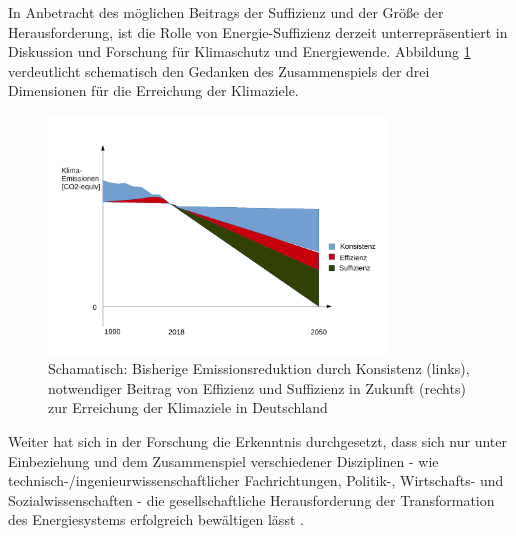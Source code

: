\documentclass[a4paper,11pt,twoside]{scrartcl}
\begin{document}
In Anbetracht des möglichen Beitrags der Suffizienz und der Größe der Herausforderung, ist die Rolle von Energie-Suffizienz derzeit unterrepräsentiert in Diskussion und Forschung für Klimaschutz und Energiewende. Abbildung \ref{fig:zusammenspiel} verdeutlicht schematisch den Gedanken des Zusammenspiels der drei Dimensionen für die Erreichung der Klimaziele. 


\begin{figure}[!h]
    \centering
    \includegraphics[width=0.8\textwidth]{figures/Zusammenspiel2.pdf}
    \caption{Schamatisch: Bisherige Emissionsreduktion durch Konsistenz (links), notwendiger Beitrag von Effizienz und Suffizienz in Zukunft (rechts) zur Erreichung der Klimaziele in Deutschland}
    \label{fig:zusammenspiel}
\end{figure}

Weiter hat sich in der Forschung die Erkenntnis durchgesetzt, dass sich nur unter Einbeziehung und dem Zusammenspiel verschiedener Disziplinen - wie technisch-/ingenieurwissenschaftlicher Fachrichtungen, Politik-, Wirtschafts- und Sozialwissenschaften - die gesellschaftliche Herausforderung der Transformation des Energiesystems erfolgreich bewältigen lässt \cite{WGBU2011}.
\end{document}
